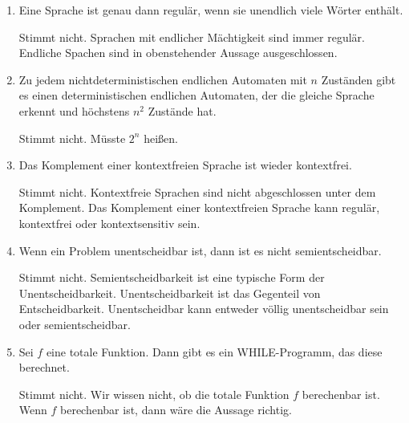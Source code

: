 \documentclass{bschlangaul-aufgabe}
\begin{document}
\begin{enumerate}


\item Eine Sprache ist genau dann regulär, wenn sie unendlich viele
Wörter enthält.

\begin{bAntwort}
Stimmt nicht. Sprachen mit endlicher Mächtigkeit sind immer regulär.
Endliche Spachen sind in obenstehender Aussage ausgeschlossen.
\end{bAntwort}


\item Zu jedem nichtdeterministischen endlichen Automaten mit $n$
Zuständen gibt es einen deterministischen endlichen Automaten, der die
gleiche Sprache erkennt und höchstens $n^2$ Zustände hat.

\begin{bAntwort}
Stimmt nicht. Müsste $2^n$ heißen.
\end{bAntwort}


\item Das Komplement einer kontextfreien Sprache ist wieder kontextfrei.

\begin{bAntwort}
Stimmt nicht. Kontextfreie Sprachen sind nicht abgeschlossen unter dem
Komplement. Das Komplement einer kontextfreien Sprache kann regulär,
kontextfrei oder kontextsensitiv sein.
\end{bAntwort}


\item Wenn ein Problem unentscheidbar ist, dann ist es nicht
semientscheidbar.

\begin{bAntwort}
Stimmt nicht. Semientscheidbarkeit ist eine typische Form der
Unentscheidbarkeit. Unentscheidbarkeit ist das Gegenteil von
Entscheidbarkeit. Unentscheidbar kann entweder völlig unentscheidbar
sein oder semientscheidbar.
\end{bAntwort}


\item Sei $f$ eine totale Funktion. Dann gibt es ein WHILE-Programm, das
diese berechnet.

\begin{bAntwort}
Stimmt nicht. Wir wissen nicht, ob die totale Funktion $f$ berechenbar
ist. Wenn $f$ berechenbar ist, dann wäre die Aussage richtig.
\end{bAntwort}


\end{enumerate}
\end{document}
